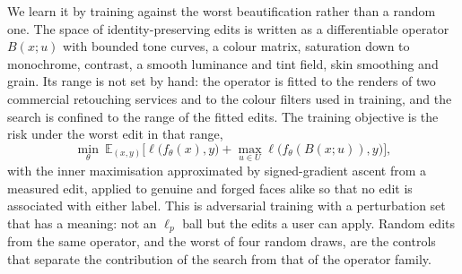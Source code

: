 We learn it by training against the worst beautification rather than a random one. The space of identity-preserving edits
is written as a differentiable operator $B(x;u)$ with bounded tone curves, a colour matrix, saturation down to monochrome,
contrast, a smooth luminance and tint field, skin smoothing and grain. Its range is not set by hand: the operator is fitted
to the renders of two commercial retouching services and to the colour filters used in training, and the search is
confined to the range of the fitted edits. The training objective is the risk under the worst edit in that range,
\begin{equation*}
\min_\theta\ \mathbb{E}_{(x,y)}\Big[\ell\big(f_\theta(x),y\big)+\max_{u\in U}\ell\big(f_\theta(B(x;u)),y\big)\Big],
\end{equation*}
with the inner maximisation approximated by signed-gradient ascent from a measured edit, applied to genuine and forged
faces alike so that no edit is associated with either label. This is adversarial training with a perturbation set that
has a meaning: not an $\ell_p$ ball but the edits a user can apply. Random edits from the same operator, and the worst of
four random draws, are the controls that separate the contribution of the search from that of the operator family.

